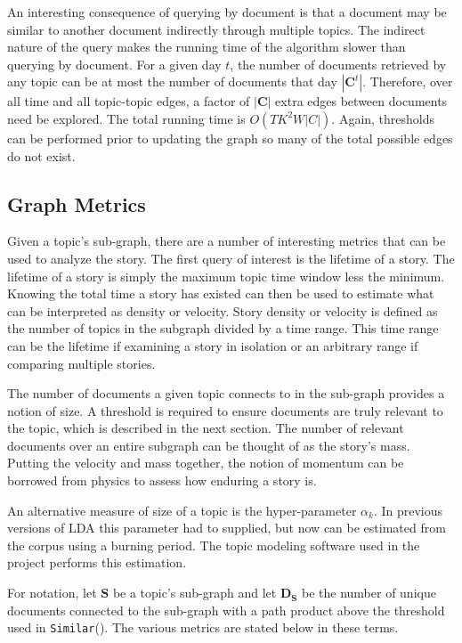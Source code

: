 \documentclass[10pt,twocolumn]{article}
\begin{document}
An interesting consequence of querying by document is that a document may be similar to another document indirectly through multiple topics. The indirect nature of the query makes the running time of the algorithm slower than querying by document.  For a given day $t$, the number of documents retrieved by any topic can be at most the number of documents that day $|\mathbf{C}^t|$.  Therefore, over all time and all topic-topic edges, a factor of $|\mathbf{C}|$ extra edges between documents need be explored.  The total running time is $O(TK^2W|C|)$.  Again, thresholds can be performed prior to updating the graph so many of the total possible edges do not exist.
  
\subsection {Graph Metrics}

Given a topic's sub-graph, there are a number of interesting metrics that can be used to analyze the story. The first query of interest is the lifetime of a story.  The lifetime of a story is simply the maximum topic time window less the minimum.  Knowing the total time a story has existed can then be used to estimate what can be interpreted as density or velocity.  Story density or velocity is defined as the number of topics in the subgraph divided by a time range.  This time range can be the lifetime if examining a story in isolation or an arbitrary range if comparing multiple stories.  

The number of documents a given topic connects to in the sub-graph provides a notion of size.  A threshold is required to ensure documents are truly relevant to the topic, which is described in the next section.  The number of relevant documents over an entire subgraph can be thought of as the story's mass. Putting the velocity and mass together, the notion of momentum can be borrowed from physics to assess how enduring a story is. 

An alternative measure of size of a topic is the hyper-parameter $\alpha_k$.  In previous versions of LDA this parameter had to supplied, but now can be estimated from the corpus using a burning period.  The topic modeling software used in the project performs this estimation.

For notation, let $\mathbf{S}$ be a topic's sub-graph and let $\mathbf{D}_\mathbf{S}$ be the number of unique documents connected to the sub-graph with a path product above the threshold used in \texttt{Similar}().  The various metrics are stated below in these terms.
\end{document}
